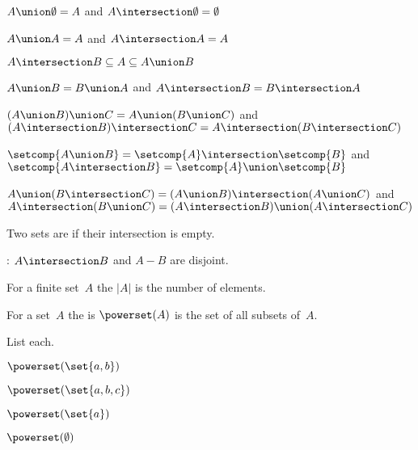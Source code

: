 \documentclass{ibl}
\begin{document}
\begin{ex}
\begin{exes}
\item $A\union\emptyset=A$ and $A\intersection\emptyset=\emptyset$
\item {} $A\union A=A$ and $A\intersection A=A$  
\item $A\intersection B\subseteq A\subseteq A\union B$  
\item {}
   $A\union B=B\union A$ and $A\intersection B=B\intersection A$
\item {} 
  $(A\union B)\union C=A\union (B\union C)$
  and $(A\intersection B)\intersection C=A\intersection (B\intersection C)$
\item 
  $\setcomp{A\union B}=\setcomp{A}\intersection\setcomp{B}$
  and 
  $\setcomp{A\intersection B}=\setcomp{A}\union\setcomp{B}$
\item {} 
$A\union (B\intersection C)=(A\union B)\intersection (A\union C)$
 and $A\intersection (B\union C)=(A\intersection B)\union (A\intersection C)$
\end{exes}
\end{ex}

\begin{df}
Two sets are  if their intersection is empty.  
\end{df}

\begin{ex}
\pord: $A\intersection B$ and $A-B$ are disjoint.  
\end{ex}

\begin{df}
For a finite set~$A$ the  $|A|$ is the number of elements.
\end{df}


\begin{df}
For a set~$A$ the  is $\powerset(A)$ is the set of all
subsets of~$A$.
\end{df}

\begin{ex} List each.
\begin{exes}
\item $\powerset(\set{a,b})$   
\item $\powerset(\set{a,b,c})$   
\item $\powerset(\set{a})$   
\item $\powerset(\emptyset)$   
\end{exes}
\end{ex}
\end{document}
